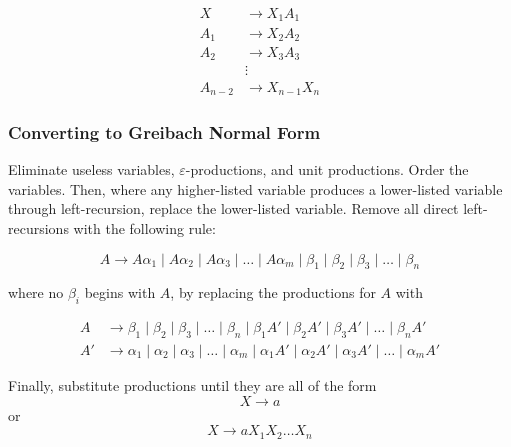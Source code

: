 \begin{align*}
    X &\to X_1A_1\\
    A_1 &\to X_2A_2\\
    A_2 &\to X_3A_3\\
        &\vdots\\
    A_{n-2} &\to X_{n-1}X_n
\end{align*}

\subsubsection{Converting to Greibach Normal Form}
Eliminate useless variables, \(\varepsilon \)-productions, and unit productions. Order the variables. Then, where any higher-listed variable produces a lower-listed variable through left-recursion, replace the lower-listed variable. Remove all direct left-recursions with the following rule:

\[A\to A\alpha_1 \mid A\alpha_2 \mid A\alpha_3 \mid \hdots \mid A\alpha_m \mid \beta_1 \mid \beta_2 \mid \beta_3 \mid \hdots \mid \beta_n\] 

where no \(\beta_i\) begins with \(A\), by replacing the productions for \(A\) with 

\begin{align*}
    A  &\to \beta_1\mid \beta_2\mid \beta_3\mid \hdots \mid \beta_n\mid\beta_1 A'\mid \beta_2 A'\mid \beta_3 A'\mid \hdots \mid \beta_n A'\\
    A' &\to \alpha_1\mid \alpha_2\mid \alpha_3\mid \hdots \mid \alpha_m\mid \alpha_1 A'\mid \alpha_2 A'\mid \alpha_3 A' \mid \hdots \mid \alpha_m A'
\end{align*}

Finally, substitute productions until they are all of the form \[X\to a\] or \[X\to aX_1 X_2\hdots X_n\]